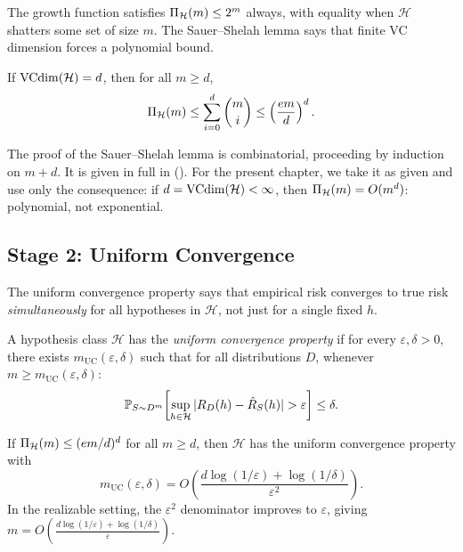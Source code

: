 The growth function satisfies $\Pi_\mathcal{H}(m) \leq 2^m$ always, with
equality when $\mathcal{H}$ shatters some set of size $m$.  The Sauer--Shelah
lemma says that finite VC dimension forces a polynomial bound.

\begin{lemma}
\label{lem:sauer-shelah-pac}
If $\mathrm{VCdim}(\mathcal{H}) = d$, then for all $m \geq d$,
\[
  \Pi_\mathcal{H}(m)
  \leq \sum_{i=0}^d \binom{m}{i}
  \leq \left(\frac{em}{d}\right)^d.
\]
\end{lemma}

The proof of the Sauer--Shelah lemma is combinatorial, proceeding by induction
on $m + d$.  It is given in full in 
().  For the present chapter, we take it as given
and use only the consequence: if $d = \mathrm{VCdim}(\mathcal{H}) < \infty$, then
$\Pi_\mathcal{H}(m) = O(m^d)$: polynomial, not exponential.



\subsection{Stage 2: Uniform Convergence}
\label{sec:uniform-convergence-pac}

The uniform convergence property says that empirical risk converges to true risk
\emph{simultaneously} for all hypotheses in $\mathcal{H}$, not just for a
single fixed $h$.

\begin{defn}
\label{def:unif-conv}
A hypothesis class $\mathcal{H}$ has the \emph{uniform convergence property}
if for every $\varepsilon, \delta > 0$, there exists
$m_{\mathrm{UC}}(\varepsilon, \delta)$ such that for all distributions $D$,
whenever $m \geq m_{\mathrm{UC}}(\varepsilon, \delta)$:
\[
  \mathbb{P}_{S \sim D^m}\!\left[
    \sup_{h \in \mathcal{H}} |R_D(h) - \hat{R}_S(h)| > \varepsilon
  \right] \leq \delta.
\]
\end{defn}

\begin{thm}
\label{thm:unif-conv}
If $\Pi_\mathcal{H}(m) \leq (em/d)^d$ for all $m \geq d$, then
$\mathcal{H}$ has the uniform convergence property with
\[
  m_{\mathrm{UC}}(\varepsilon, \delta)
  = O\!\left(\frac{d \log(1/\varepsilon) + \log(1/\delta)}{\varepsilon^2}\right).
\]
In the realizable setting, the $\varepsilon^2$ denominator improves to
$\varepsilon$, giving $m = O\!\left(\frac{d\log(1/\varepsilon) +
\log(1/\delta)}{\varepsilon}\right)$.
\end{thm}

